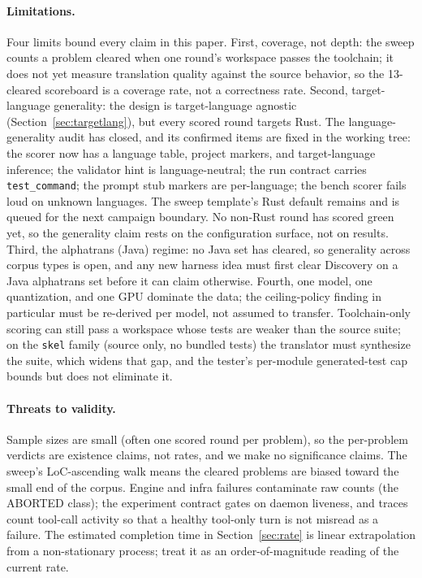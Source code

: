 \documentclass[11pt]{article}
\begin{document}
\paragraph{Limitations.}
\label{sec:limitations}
Four limits bound every claim in this paper. First, coverage, not
depth: the sweep counts a problem cleared when one round's workspace
passes the toolchain; it does not yet measure translation quality
against the source behavior, so the 13-cleared scoreboard is a
coverage rate, not a correctness rate. Second, target-language
generality: the design is target-language agnostic
(Section~\ref{sec:targetlang}), but every scored round targets Rust. The language-generality audit has closed, and its confirmed items are
fixed in the working tree: the scorer now has a language table, project
markers, and target-language inference; the validator hint is
language-neutral; the run contract carries \texttt{test\_command}; the
prompt stub markers are per-language; the bench scorer fails loud on
unknown languages. The sweep template's Rust default remains and is
queued for the next campaign boundary. No non-Rust round has scored
green yet, so the
generality claim rests on the configuration surface, not on results.
Third, the alphatrans (Java) regime: no Java set has cleared, so
generality across corpus types is
open, and any new harness idea must first clear Discovery on a Java
alphatrans set before it can claim otherwise. Fourth, one model, one
quantization, and one GPU dominate the data; the ceiling-policy finding
in particular must be re-derived per model, not assumed to transfer.
Toolchain-only scoring can still pass a workspace whose tests are
weaker than the source suite; on the \texttt{skel} family (source
only, no bundled tests) the translator must synthesize the suite, which
widens that gap, and the tester's per-module generated-test cap bounds
but does not eliminate it.

\paragraph{Threats to validity.}
Sample sizes are small (often one scored round per problem), so the
per-problem verdicts are existence claims, not rates, and we make no
significance claims. The sweep's LoC-ascending walk means the cleared
problems are biased toward the small end of the corpus. Engine and
infra failures contaminate raw counts (the ABORTED class); the
experiment contract gates on daemon liveness, and traces count
tool-call activity so that a healthy tool-only turn is not misread as a
failure. The estimated completion time in Section~\ref{sec:rate} is
linear extrapolation from a non-stationary process; treat it as an
order-of-magnitude reading of the current rate.
\end{document}
